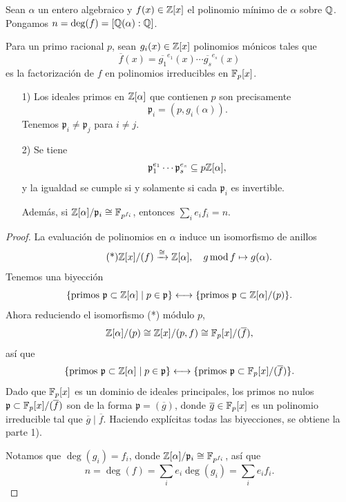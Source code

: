 \begin{teorema}
  Sean $\alpha$ un entero algebraico y $f (x) \in \mathbb{Z} [x]$ el polinomio mínimo
  de $\alpha$ sobre $\mathbb{Q}$. Pongamos $n = \deg (f) = [\mathbb{Q} (\alpha) : \mathbb{Q}]$.

  Para un primo racional $p$, sean $g_i (x) \in \mathbb{Z} [x]$ polinomios mónicos
  tales que
  $$\overline{f} (x) = \overline{g_1}^{e_1} (x) \cdots \overline{g_s}^{e_s} (x)$$
  es la factorización de $f$ en polinomios irreducibles en $\mathbb{F}_p [x]$.

  \begin{enumerate}
  \item[1)] Los ideales primos en $\mathbb{Z} [\alpha]$ que contienen $p$ son precisamente
    $$\mathfrak{p}_i = (p, g_i (\alpha)).$$
    Tenemos $\mathfrak{p}_i \ne \mathfrak{p}_j$ para $i\ne j$.

  \item[2)] Se tiene
    $$\mathfrak{p}_1^{e_1} \cdots \mathfrak{p}_s^{e_s} \subseteq p \mathbb{Z} [\alpha],$$
    y la igualdad se cumple si y solamente si cada $\mathfrak{p}_i$ es invertible.

    Además, si $\mathbb{Z} [\alpha]/\mathfrak{p}_i \cong \mathbb{F}_{p^{f_i}}$,
    entonces $\sum_i e_i f_i = n$.
  \end{enumerate}

  \begin{proof}
    La evaluación de polinomios en $\alpha$ induce un isomorfismo de anillos
    \[ \tag{*} \mathbb{Z} [x] / (f) \xrightarrow{\cong} \mathbb{Z} [\alpha], \quad
       g \operatorname{mod} f \mapsto g (\alpha). \]
    Tenemos una biyección
    \[ \{ \text{primos }\mathfrak{p}\subset\mathbb{Z}[\alpha] \mid p\in\mathfrak{p} \}
       \longleftrightarrow
       \{ \text{primos }\mathfrak{p} \subset \mathbb{Z}[\alpha]/(p) \}. \]
    Ahora reduciendo el isomorfismo (*) módulo $p$,
    $$\mathbb{Z}[\alpha]/(p) \cong \mathbb{Z} [x] / (p,f) \cong \mathbb{F}_p [x]/(\overline{f}),$$
    así que
    \[ \{ \text{primos }\mathfrak{p}\subset\mathbb{Z}[\alpha] \mid p \in \mathfrak{p} \}
       \longleftrightarrow
       \{ \text{primos }\mathfrak{p}\subset\mathbb{F}_p [x]/(\overline{f}) \}. \]
    Dado que $\mathbb{F}_p [x]$ es un dominio de ideales principales, los primos no
    nulos $\mathfrak{p} \subset \mathbb{F}_p [x]/(\overline{f})$ son de la forma
    $\mathfrak{p} = (\overline{g})$, donde $\overline{g} \in \mathbb{F}_p [x]$
    es un polinomio irreducible tal que $\overline{g} \mid \overline{f}$.
    Haciendo explícitas todas las biyecciones, se obtiene la parte 1).

    Notamos que $\deg (g_i) = f_i$, donde
    $\mathbb{Z}[\alpha]/\mathfrak{p}_i \cong \mathbb{F}_{p^{f_i}}$, así que
    $$n = \deg (f) = \sum_i e_i \deg (g_i) = \sum_i e_i f_i.$$


\end{proof}
\end{teorema}
